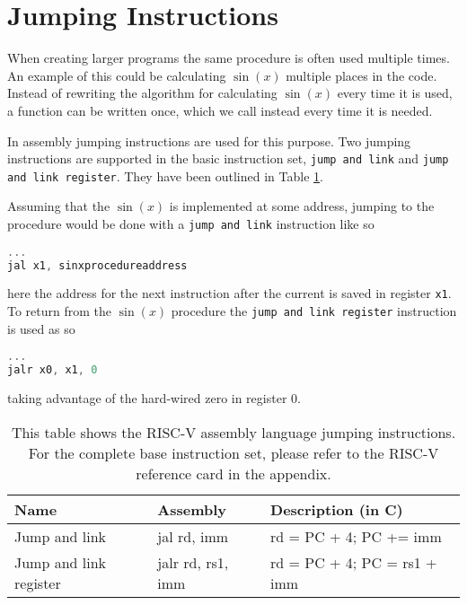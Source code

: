     \section{Jumping Instructions}
        When creating larger programs the same procedure is often used multiple times. An example of this could be calculating $\sin(x)$ multiple places in the code. Instead of rewriting the algorithm for calculating $\sin(x)$ every time it is used, a function can be written once, which we call instead every time it is needed.
        
        In assembly jumping instructions are used for this purpose. Two jumping instructions are supported in the basic instruction set, \texttt{jump and link} and \texttt{jump and link register}. They have been outlined in Table \ref{table:RISCVJumpingInstructions}.
        
        Assuming that the $\sin(x)$ is implemented at some address, jumping to the procedure would be done with a \texttt{jump and link} instruction like so
        \begin{lstlisting}[language=C]
...
jal x1, sinxprocedureaddress
        \end{lstlisting}
        here the address for the next instruction after the current is saved in register \texttt{x1}. To return from the $\sin(x)$ procedure the \texttt{jump and link register} instruction is used as so
        \begin{lstlisting}[language=C]
...
jalr x0, x1, 0
        \end{lstlisting}
        taking advantage of the hard-wired zero in register 0.
        
        \begin{table}[h!]
            \centering
            \begin{tabular}{|l|l|l|}
            	\hline
            	Name                   & Assembly          & Description (in C)          \\ \hline
            	Jump and link          & jal rd, imm       & rd = PC + 4; PC += imm      \\
            	Jump and link register & jalr rd, rs1, imm & rd = PC + 4; PC = rs1 + imm \\ \hline
            \end{tabular}
            \caption{This table shows the RISC-V assembly language jumping instructions. For the complete base instruction set, please refer to the RISC-V reference card in the appendix.}
            \label{table:RISCVJumpingInstructions}
        \end{table}
    
